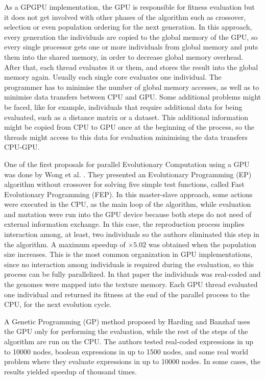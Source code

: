 \documentclass[review]{elsarticle}
\begin{document}
As a GPGPU implementation, the GPU is responsible for fitness evaluation but it does not get involved with other phases of the algorithm such as crossover, selection or even population ordering for the next generation. In this approach, every generation the individuals are copied to the global memory of the GPU, so every single processor gets one or more individuals from global memory and puts them into the shared memory, in order to decrease global memory overhead. After that, each thread evaluates it or them, and stores the result into the global memory again. Usually each single core evaluates one individual. The programmer has to minimise the number of global memory accesses, as well as to minimise data transfers between CPU and GPU. Some additional problems might be faced, like for example, individuals that require additional data for being evaluated, such as a distance matrix or a dataset. This additional information might be copied from CPU to GPU once at the beginning of the process, so the threads might access to this data for evaluation minimising the data transfers CPU-GPU. 

One of the first proposals for parallel Evolutionary Computation using a GPU was done by Wong et al. \cite{man-leung-wong-parallel-2005}. They presented an Evolutionary Programming (EP) algorithm without crossover for solving five simple test functions, called Fast Evolutionary Programming (FEP). In this master-slave approach, some actions were executed in the CPU, as the main loop of the algorithm, while evaluation and mutation were run into the GPU device because both steps do not need of external information exchange. In this case, the reproduction process implies interaction among, at least, two individuals so the authors eliminated this step in the algorithm. A maximum speedup of $\times5.02$ was obtained when the population size increases. This is the most common organization in GPU implementations, since no interaction among individuals is required during the evaluation, so this process can be fully parallelized. In that paper the individuals was real-coded and the genomes were mapped into the texture memory. Each GPU thread evaluated one individual and returned its fitness at the end of the parallel process to the CPU, for the next evolution cycle.

A Genetic Programming (GP) method proposed by Harding and Banzhaf \cite{4215552} uses the GPU only for performing the evaluation, while the rest of the steps of the algorithm are run on the CPU. The authors tested real-coded expressions in up to 10000 nodes, boolean expressions in up to 1500 nodes, and some real world problem where they evaluate expressions in up to 10000 nodes. In some cases, the results yielded speedup of thousand times.
\end{document}
